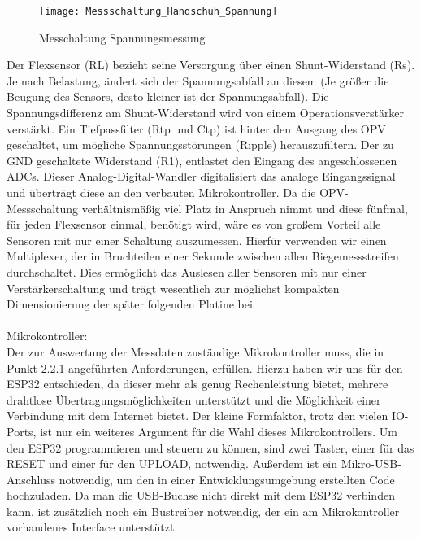 \documentclass[11pt]{article}
\begin{document}
\begin{figure}[h]
	\begin{center}
	\scalebox{0.5}
	{\texttt{[image: Messschaltung\_Handschuh\_Spannung]}}
	\caption{Messchaltung Spannungsmessung}
	\end{center}
\end{figure}

Der Flexsensor (RL) bezieht seine Versorgung über einen Shunt-Widerstand (Rs). Je nach Belastung, ändert sich der 
Spannungsabfall an diesem (Je größer die Beugung des Sensors, desto kleiner ist der Spannungsabfall). Die Spannungsdifferenz 
am Shunt-Widerstand wird von einem Operationsverstärker verstärkt. Ein Tiefpassfilter (Rtp und Ctp) ist hinter den Ausgang des 
OPV geschaltet, um mögliche Spannungsstörungen (Ripple) herauszufiltern. Der zu GND geschaltete Widerstand (R1), entlastet 
den Eingang des angeschlossenen ADCs. Dieser Analog-Digital-Wandler digitalisiert das analoge Eingangssignal und überträgt 
diese an den verbauten Mikrokontroller. Da die OPV-Messschaltung verhältnismäßig viel Platz in Anspruch nimmt und diese 
fünfmal, für jeden Flexsensor einmal, benötigt wird, wäre es von großem Vorteil alle Sensoren mit nur einer Schaltung 
auszumessen. Hierfür verwenden wir einen Multiplexer, der in Bruchteilen einer Sekunde zwischen allen Biegemessstreifen 
durchschaltet. Dies ermöglicht das Auslesen aller Sensoren mit nur einer Verstärkerschaltung und trägt wesentlich zur 
möglichst kompakten Dimensionierung der später folgenden Platine bei.\\
\\
Mikrokontroller:
\\
Der zur Auswertung der Messdaten zuständige Mikrokontroller muss, die in Punkt 2.2.1 angeführten Anforderungen, erfüllen. 
Hierzu haben wir uns für den ESP32 entschieden, da dieser mehr als genug Rechenleistung bietet, mehrere drahtlose 
Übertragungsmöglichkeiten unterstützt und die Möglichkeit einer Verbindung mit dem Internet bietet. Der kleine Formfaktor, 
trotz den vielen IO-Ports, ist nur ein weiteres Argument für die Wahl dieses Mikrokontrollers. Um den ESP32 programmieren 
und steuern zu können, sind zwei Taster, einer für das RESET und einer für den UPLOAD, notwendig. Außerdem ist ein 
Mikro-USB-Anschluss notwendig, um den in einer Entwicklungsumgebung erstellten Code hochzuladen. Da man die USB-Buchse 
nicht direkt mit dem ESP32 verbinden kann, ist zusätzlich noch ein Bustreiber notwendig, der ein am Mikrokontroller 
vorhandenes Interface unterstützt.  
\end{document}

